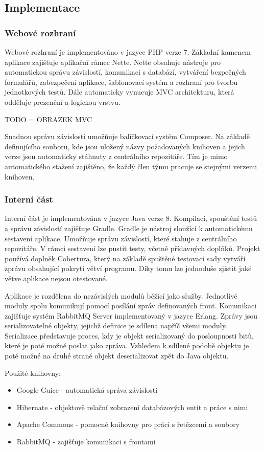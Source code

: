 \documentclass[thesis=B,czech]{FITthesis}[2012/06/26]
\begin{document}
\subsection{Implementace}
\subsubsection{Webové rozhraní}
Webové rozhraní je implementováno v jazyce PHP verze 7. Základní kamenem aplikace zajišťuje aplikační rámec Nette. Nette
obsahuje nástroje pro automatickou správu závislostí, komunikaci s databází, vytváření bezpečných formulářů, zabezpečení
aplikace, šablonovací systém a rozhraní pro tvorbu jednotkových testů. Dále automaticky vynucuje MVC architekturu, která odděluje
prezenční a logickou vrstvu.

TODO = OBRAZEK MVC
\par
Snadnou správu závislostí umožňuje balíčkovací systém Composer. 
Na základě definujícího souboru, kde jsou uložený názvy požadovaných knihoven a jejich verze jsou automaticky 
stáhnuty z centrálního repozitáře. Tím je mimo automatického stažení zajištěno, že každý člen týmu pracuje se stejnými verzemi knihoven.
\subsubsection{Interní část}
Interní část je implementována v jazyce Java verze 8. Kompilaci, spouštění testů a správu závislostí zajišťuje Gradle.
Gradle je nástroj sloužící k automatickému sestavení aplikace. Umožňuje správu závislostí, které stahuje z centrálního repozitáře. V rámci sestavení lze pustit testy, včetně přídavných doplňků. Projekt používá
doplněk Cobertura, který na základě spuštěné testovací sady vytváří zprávu obsahující pokrytí větví programu.
Díky tomu lze jednoduše zjistit jaké větve aplikace nejsou otestované.
\par
Aplikace je rozdělena do nezávislých modulů běžící jako služby. Jednotlivé moduly spolu komunikují
pomocí posílání zpráv definovaných front. Komunikaci zajišťuje systém RabbitMQ Server implementovaný v jazyce Erlang. Zprávy jsou serializovatelné objekty, jejichž definice je sdílena napříč všemi moduly.
Serializace představuje proces, kdy je objekt serializovaný do posloupnosti bitů, které je poté
možné poslat jako zpráva. Vzhledem k sdílené podobě objektu je poté možné na druhé strané
objekt deserializovat zpět do Java objektu.

\par
Použité knihovny:
\begin{itemize}
\item Google Guice - automatická správa závislostí
\item Hibernate - objektově relační zobrazení databázových entit a práce s nimi
\item Apache Commons - pomocné knihovny pro práci s řetězcemi a soubory
\item RabbitMQ - zajišťuje komunikaci s frontami
\end{itemize}
\end{document}
